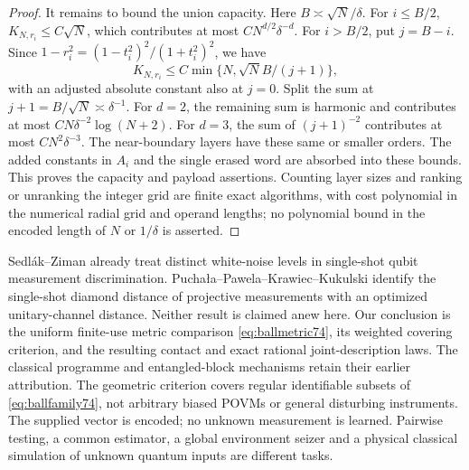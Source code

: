 \begin{proof}
It remains to bound the union capacity. Here $B\asymp\sqrt N/\delta$.
For $i\le B/2$, $K_{N,r_i}\le C\sqrt N$, which contributes at most
$C N^{d/2}\delta^{-d}$. For $i>B/2$, put $j=B-i$. Since
$1-r_i^2=(1-t_i^2)^2/(1+t_i^2)^2$, we have
\[
 K_{N,r_i}\le C\min\{N,\sqrt N B/(j+1)\},
\]
with an adjusted absolute constant also at $j=0$.
Split the sum at $j+1=B/\sqrt N\asymp\delta^{-1}$.
For $d=2$, the remaining sum is harmonic and contributes at most
$C N\delta^{-2}\log(N+2)$. For $d=3$, the sum of $(j+1)^{-2}$
contributes at most $C N^2\delta^{-3}$. The near-boundary layers have
these same or smaller orders. The added constants in $A_i$ and the
single erased word are absorbed into these bounds. This proves the
capacity and payload assertions. Counting layer sizes and ranking or
unranking the integer grid are finite exact algorithms, with cost
polynomial in the numerical radial grid and operand lengths; no
polynomial bound in the encoded length of $N$ or $1/\delta$ is asserted.
\end{proof}

\begin{remark}\label{rem:jointscope74}
Sedl\'ak--Ziman \cite[Section VI, Example 4, equation (37)]{SZ74}
already treat distinct white-noise levels in single-shot qubit
measurement discrimination. Pucha\l a--Pawela--Krawiec--Kukulski
\cite[Theorem 1]{PPKK74} identify the single-shot diamond distance
of projective measurements with an optimized unitary-channel distance.
Neither result is claimed anew here. Our conclusion is the uniform
finite-use metric comparison \eqref{eq:ballmetric74}, its weighted
covering criterion, and the resulting contact and exact rational
joint-description laws. The classical programme and entangled-block
mechanisms retain their earlier attribution. The geometric criterion
covers regular identifiable subsets of \eqref{eq:ballfamily74}, not
arbitrary biased POVMs or general disturbing instruments. The supplied
vector is encoded; no unknown measurement is learned. Pairwise testing,
a common estimator, a global environment seizer and a physical classical
simulation of unknown quantum inputs are different tasks.
\end{remark}
